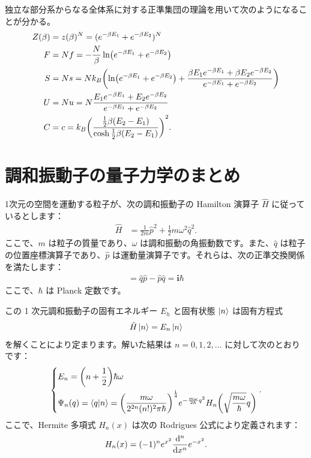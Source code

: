 \documentclass[uplatex,dvipdfmx,a4paper,11pt]{jlreq}
\theoremstyle{definition}
\newcommand{\ii}{\bm{i}}
\begin{document}
独立な部分系からなる全体系に対する正準集団の理論を用いて次のようになることが分かる。
\begin{align}
  Z(\beta) & = z(\beta)^N = (e^{-\beta E_1} + e^{-\beta E_2})^N                                                                                                \\
  F        & = Nf = -\frac{N}{\beta}\ln(e^{-\beta E_1} + e^{-\beta E_2})                                                                                       \\
  S        & = Ns = Nk_B\qty(\ln(e^{-\beta E_1} + e^{-\beta E_2}) + \frac{\beta E_1e^{-\beta E_1} + \beta E_2e^{-\beta E_2}}{e^{-\beta E_1} + e^{-\beta E_2}}) \\
  U        & = Nu = N\frac{E_1e^{-\beta E_1} + E_2e^{-\beta E_2}}{e^{-\beta E_1} + e^{-\beta E_2}}                                                             \\
  C        & = c = k_B\qty(\frac{\frac{1}{2}\beta(E_2 - E_1)}{\cosh\frac{1}{2}\beta(E_2 - E_1)})^2.
\end{align}

\section{調和振動子の量子力学のまとめ}

1次元の空間を運動する粒子が、次の調和振動子の Hamilton 演算子 $\hat{H}$ に従っているとします：
\begin{align}
  \hat{H} & = \frac{1}{2m}\hat{p}^2 + \frac{1}{2}m\omega^2\hat{q}^2.
\end{align}
ここで、$m$ は粒子の質量であり、$\omega$ は調和振動の角振動数です。また、$\hat{q}$ は粒子の位置座標演算子であり、$\hat{p}$ は運動量演算子です。それらは、次の正準交換関係を満たします：
\begin{align}
  [\hat{q}, \hat{p}] = \hat{q}\hat{p} - \hat{p}\hat{q} = \ii\hbar
\end{align}
ここで、$\hbar$ は Planck 定数です。

この 1 次元調和振動子の固有エネルギー $E_h$ と固有状態 $\ket{n}$ は固有方程式
\begin{align}
  \hat{H}\ket{n} = E_n\ket{n}
\end{align}
を解くことにより定まります。解いた結果は $n = 0, 1, 2, \ldots$ に対して次のとおりです：
\begin{align}
  \begin{dcases}
    E_n        = \qty(n + \frac{1}{2})\hbar\omega \\
    \Psi_n(q) = \braket{q}{n} = \qty(\frac{m\omega}{2^{2n}(n!)^2\pi\hbar})^{\frac{1}{4}}e^{-\frac{m\omega}{2\hbar}q^2}H_n\qty(\sqrt{\frac{m\omega}{\hbar}}q)
  \end{dcases}.
\end{align}
ここで、Hermite 多項式 $H_n(x)$ は次の Rodrigues 公式により定義されます：
\begin{align}
  H_n(x) = (-1)^ne^{x^2}\dv[n]{x}e^{-x^2}.
\end{align}
\end{document}
